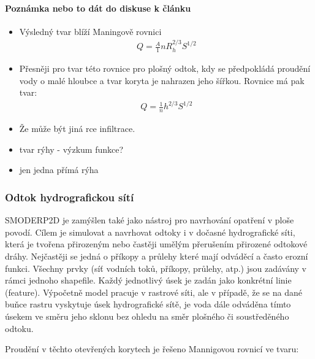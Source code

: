 




\paragraph{Poznámka nebo to dát do diskuse k článku} 
\begin{itemize}
\item Výsledný tvar blíží Maningově rovnici
\begin{eqnarray}
Q =\frac A {1}{n} R_{h}^{2/3} S^{1/2}
\end{eqnarray}
\item Přesněji pro tvar této rovnice pro plošný odtok, kdy se předpokládá proudění vody  o malé hloubce a tvar koryta je nahrazen jeho šířkou. Rovnice má pak tvar:
\begin{eqnarray}
Q =\frac {1}{n} h^{2/3} S^{1/2}
\end{eqnarray}
\item Že může být jiná rce infiltrace.
\item tvar rýhy - výzkum funkce?
\item jen jedna přímá rýha
\end{itemize}

\subsubsection{Odtok hydrografickou sítí} \label{sec:tokyodtok}

SMODERP2D je zamýšlen také jako nástroj pro navrhování opatření v ploše povodí. Cílem je simulovat a navrhovat odtoky i v dočasné hydrografické síti, která je tvořena přirozeným nebo častěji umělým přerušením přirozené odtokové dráhy. Nejčastěji se jedná o příkopy a průlehy které mají odváděcí a často erozní funkci. 
Všechny prvky (síť vodních toků, příkopy, průlehy, atp.) jsou zadávány v rámci jednoho shapefile. Každý jednotlivý úsek je zadán jako konkrétní linie (feature). Výpočetně model pracuje v rastrové síti, ale v případě, že se na dané buňce rastru vyskytuje úsek hydrografické sítě, je voda dále odváděna tímto úsekem ve směru jeho sklonu  bez ohledu na směr plošného či soustředěného odtoku.

Proudění v těchto otevřených korytech je řešeno Mannigovou rovnicí ve tvaru:

